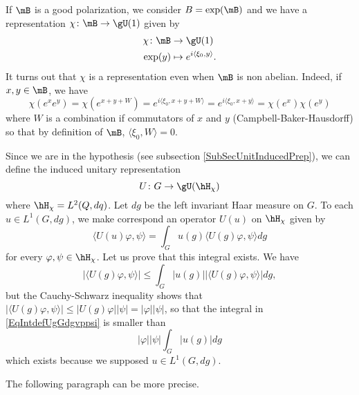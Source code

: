 If $\mB$ is a good polarization, we consider $B=\exp(\mB)$ and we have a representation $\chi\colon \mB\to \gU(1)$ given by
\begin{equation}
	\begin{aligned}
		\chi\colon \mB&\to \gU(1) \\
		\exp(y)&\mapsto  e^{i\langle \xi_0, y\rangle }. 
	\end{aligned}
\end{equation}
It turns out that $\chi$ is a representation even when $\mB$ is non abelian. Indeed, if $x,y\in\mB$, we have
\begin{equation}
	\chi( e^{x} e^{y})=\chi( e^{x+y+W})= e^{i\langle \xi_0, x+y+W\rangle }= e^{i\langle \xi_0, x+y\rangle }= \chi( e^{x})\chi( e^{y})
\end{equation}
where $W$ is a combination if commutators of $x$ and $y$ (Campbell-Baker-Hausdorff) so that by definition of $\mB$, $\langle \xi_0, W\rangle =0$.

Since we are in the hypothesis (see subsection \ref{SubSecUnitInducedPrep}), we can define the induced unitary representation
\begin{equation}
	U\colon G\to \gU(\hH_{\chi})
\end{equation}
where $\hH_{\chi}=L^2(Q,dq)$. Let $dg$ be the left invariant Haar measure on $G$.  To each $u\in L^1(G,dg)$, we make correspond an operator $U(u)$ on $\hH_{\chi}$ given by
\begin{equation}	\label{EqDefUudansHh}
	\langle U(u)\varphi, \psi\rangle =\int_Gu(g)\langle U(g)\varphi, \psi\rangle dg
\end{equation}
for every $\varphi,\psi\in\hH_{\chi}$. Let us prove that this integral exists. We have
\begin{equation}	\label{EqIntdefUgGdgvppsi}
		| \langle U(g)\varphi, \psi\rangle  |\leq\int_G| u(g) | |\langle U(g)\varphi, \psi\rangle  |dg,
\end{equation}
but the Cauchy-Schwarz inequality shows that $| \langle U(g)\varphi, \psi\rangle  |\leq| U(g)\varphi | |\psi |=| \varphi | |\psi |$, so that the integral in \eqref{EqIntdefUgGdgvppsi} is smaller than
\begin{equation}
	| \varphi | | \psi |  \int_G| u(g) |dg
\end{equation}
which exists because we supposed $u\in L^1(G,dg)$.

\begin{probleme}
	The following paragraph can be more precise.
\end{probleme}

